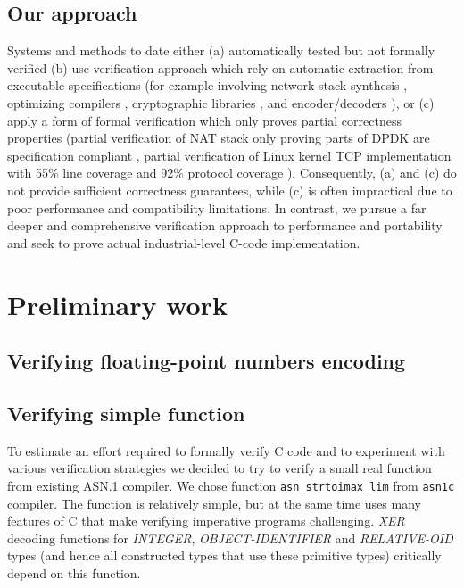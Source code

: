 \documentclass[acmsmall,nonacm]{acmart}
\begin{document}
\subsection{Our approach}

Systems and methods to date either (a) automatically tested but not
formally verified (b) use verification approach which rely on
automatic extraction from executable specifications (for example
involving network stack synthesis \cite{TODO:31}, optimizing compilers
\cite{TODO:3}, cryptographic libraries \cite{TODO:6}, and
encoder/decoders \cite{TODO:32}), or (c) apply a form of formal
verification which only proves partial correctness properties (partial
verification of NAT stack only proving parts of DPDK are specification
compliant \cite{TODO:33}, partial verification of Linux kernel TCP
implementation with 55\% line coverage and 92\% protocol coverage
\cite{TODO:34}). Consequently, (a) and (c) do not provide sufficient
correctness guarantees, while (c) is often impractical due to poor
performance and compatibility limitations. In contrast, we pursue a
far deeper and comprehensive verification approach to performance and
portability and seek to prove actual industrial-level C-code
implementation.

\section{Preliminary work}

\subsection{Verifying floating-point numbers encoding}


\subsection{Verifying simple function}

To estimate an effort required to formally verify C code and to
experiment with various verification strategies we decided to try to
verify a small real function from existing ASN.1 compiler. We chose
function \texttt{asn\_strtoimax\_lim} from \texttt{asn1c} compiler.
The function is relatively simple, but at the same time uses many
features of C that make verifying imperative programs
challenging. \emph{XER} decoding functions for \emph{INTEGER},
\emph{OBJECT-IDENTIFIER} and \emph{RELATIVE-OID} types (and hence all
constructed types that use these primitive types) critically depend on
this function.
\end{document}
